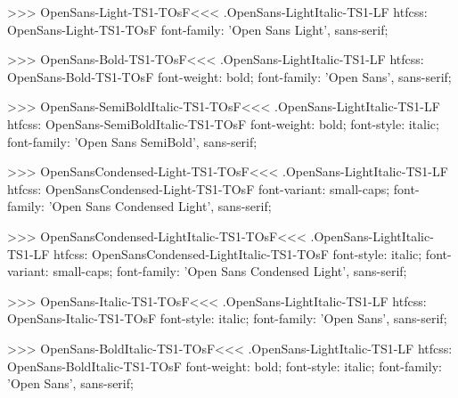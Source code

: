 >>>
\<OpenSans-Light-TS1-TOsF\><<<
.OpenSans-LightItalic-TS1-LF
htfcss:  OpenSans-Light-TS1-TOsF  font-family: 'Open Sans Light', sans-serif;

>>>
\<OpenSans-Bold-TS1-TOsF\><<<
.OpenSans-LightItalic-TS1-LF
htfcss:  OpenSans-Bold-TS1-TOsF  font-weight: bold; font-family: 'Open Sans', sans-serif;

>>>
\<OpenSans-SemiBoldItalic-TS1-TOsF\><<<
.OpenSans-LightItalic-TS1-LF
htfcss:  OpenSans-SemiBoldItalic-TS1-TOsF  font-weight: bold; font-style: italic; font-family: 'Open Sans SemiBold', sans-serif;

>>>
\<OpenSansCondensed-Light-TS1-TOsF\><<<
.OpenSans-LightItalic-TS1-LF
htfcss:  OpenSansCondensed-Light-TS1-TOsF  font-variant: small-caps; font-family: 'Open Sans Condensed Light', sans-serif;

>>>
\<OpenSansCondensed-LightItalic-TS1-TOsF\><<<
.OpenSans-LightItalic-TS1-LF
htfcss:  OpenSansCondensed-LightItalic-TS1-TOsF  font-style: italic; font-variant: small-caps; font-family: 'Open Sans Condensed Light', sans-serif;

>>>
\<OpenSans-Italic-TS1-TOsF\><<<
.OpenSans-LightItalic-TS1-LF
htfcss:  OpenSans-Italic-TS1-TOsF  font-style: italic; font-family: 'Open Sans', sans-serif;

>>>
\<OpenSans-BoldItalic-TS1-TOsF\><<<
.OpenSans-LightItalic-TS1-LF
htfcss:  OpenSans-BoldItalic-TS1-TOsF  font-weight: bold; font-style: italic; font-family: 'Open Sans', sans-serif;

